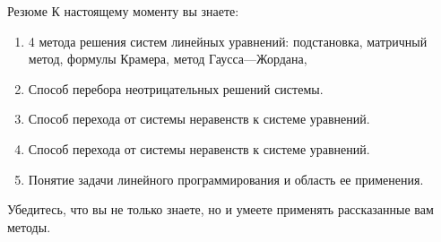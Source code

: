 \documentclass[unicode,11pt,notheorems]{beamer}
\begin{document}
	

\begin{frame}{Резюме}
	К настоящему моменту вы знаете:
	\begin{enumerate}
	\item 
		4 метода решения систем линейных уравнений: 
		подстановка, матричный метод, формулы Крамера, метод Гаусса---Жордана, 
	\item 
		Способ перебора неотрицательных решений системы.
	\item 
		Способ перехода от системы неравенств к системе уравнений.
	\item 
		Способ перехода от системы неравенств к системе уравнений.
	\item 
		Понятие задачи линейного программирования и область ее применения.
	\end{enumerate}
	Убедитесь, что вы не только знаете, но и умеете применять рассказанные вам методы.
\end{frame}
\end{document}
